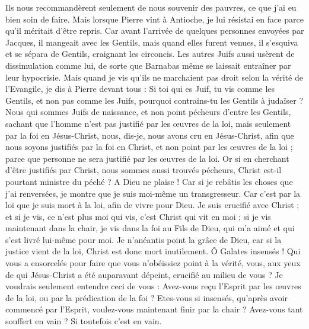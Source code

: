 \begin{multicols}{2}
Ils nous recommandèrent seulement de nous souvenir des pauvres, ce que j’ai eu bien soin de faire.
Mais lorsque Pierre vint à Antioche, je lui résistai en face parce qu'il méritait d'être repris.
Car avant l’arrivée de quelques personnes envoyées par Jacques, il mangeait avec les Gentils, mais quand elles furent venues, il s’esquiva et se sépara de Gentils, craignant les circoncis.
Les autres Juifs aussi usèrent de dissimulation comme lui, de sorte que Barnabas même se laissait entraîner par leur hypocrisie.
Mais quand je vis qu'ils ne marchaient pas droit selon la vérité de l'Evangile, je dis à Pierre devant tous : Si toi qui es Juif, tu vis comme les Gentils, et non pas comme les Juifs, pourquoi contrains-tu les Gentils à judaïser ?
Nous qui sommes Juifs de naissance, et non point pécheurs d'entre les Gentils,
sachant que l'homme n'est pas justifié par les œuvres de la loi, mais seulement par la foi en Jésus-Christ, nous, dis-je, nous avons cru en Jésus-Christ, afin que nous soyons justifiés par la foi en Christ, et non point par les œuvres de la loi ; parce que personne ne sera justifié par les œuvres de la loi.
Or si en cherchant d’être justifiés par Christ, nous sommes aussi trouvés pécheurs, Christ est-il pourtant ministre du péché ? A Dieu ne plaise !
Car si je rebâtis les choses que j'ai renversées, je montre que je suis moi-même un transgresseur.
Car c’est par la loi que je suis mort à la loi, afin de vivre pour Dieu.
Je suis crucifié avec Christ ; et si je vis, ce n’est plus moi qui vis, c’est Christ qui vit en moi ; si je vis maintenant dans la chair, je vis dans la foi au Fils de Dieu, qui m’a aimé et qui s’est livré lui-même pour moi.
Je n’anéantis point la grâce de Dieu, car si la justice vient de la loi, Christ est donc mort inutilement.
\VerseOne{}Ô Galates insensés ! Qui vous a ensorcelés pour faire que vous n'obéissiez point à la vérité, vous, aux yeux de qui Jésus-Christ a été auparavant dépeint, crucifié au milieu de vous ?
Je voudrais seulement entendre ceci de vous : Avez-vous reçu l'Esprit par les œuvres de la loi, ou par la prédication de la foi ?
Etes-vous si insensés, qu’après avoir commencé par l'Esprit, voulez-vous maintenant finir par la chair ?
Avez-vous tant souffert en vain ? Si toutefois c'est en vain.

\end{multicols}
